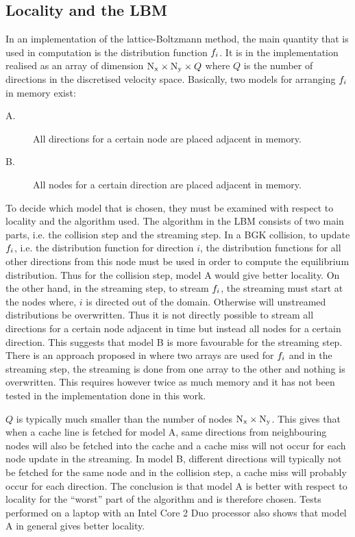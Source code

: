 
\subsection{Locality and the LBM}
In an implementation of the lattice-Boltzmann method, the main
quantity that is used in computation is the distribution
function $f_i$. It is in the implementation realised as an array of
dimension $\mathrm{N_x} \times \mathrm{N_y} \times Q$ where $Q$ is the number of
directions in the discretised velocity space. Basically, two models
for arranging $f_i$ in memory exist:

\begin{description}
  \item[A.] All directions for a certain node are placed adjacent in
    memory.
  \item[B.] All nodes for a certain direction are placed adjacent in
    memory.
\end{description}

To decide which model that is chosen, they must be examined with
respect to locality and the algorithm used. The algorithm in the LBM
consists of two main parts, i.e. the collision step and the streaming
step. In a BGK collision, to update $f_i$, i.e. the distribution
function for direction $i$, the distribution functions for all other
directions from this node must be used in order to compute the
equilibrium distribution. Thus for the collision step, model A would
give better locality. On the other hand, in the streaming step, to
stream $f_i$, the streaming must start at the nodes where, $i$ is
directed out of the domain. Otherwise will unstreamed distributions be
overwritten. Thus it is not directly possible to stream all directions
for a certain node adjacent in time but instead all nodes for a
certain direction. This suggests that model B is more favourable for
the streaming step. There is an approach proposed in \cite{mikael}
where two arrays are used for $f_i$ and in the streaming step, the
streaming is done from one array to the other and nothing is
overwritten. This requires however twice as much memory and it has not
been tested in the implementation done in this work.

$Q$ is typically much smaller than the number of nodes $\mathrm{N_x} \times
\mathrm{N_y}$. This gives that when a cache line is fetched for model A, same
directions from neighbouring nodes will also be fetched into the cache
and a cache miss will not occur for each node update in the
streaming. In model B, different directions will typically not be
fetched for the same node and in the collision step, a cache miss will
probably occur for each direction. The conclusion is that model A is
better with respect to locality for the ``worst'' part of the
algorithm and is therefore chosen. Tests performed on a laptop with
an Intel Core 2 Duo processor also shows that model A in general gives
better locality.


